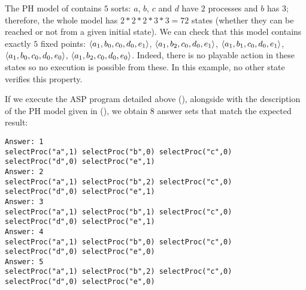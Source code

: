 \begin{example}
The PH model of  contains $5$ sorts:
$a$, $b$, $c$ and $d$ have $2$ processes and $b$ has 3; therefore, the whole model has $2*2*2*3*3 = 72$ states (whether they can be reached or not from a given initial state).
We can check that this model contains exactly $5$ fixed points: $\mbox{$\langle a_1, b_0, c_0, d_0, e_1 \rangle$}$, $\mbox{$\langle a_1, b_2, c_0, d_0, e_1 \rangle$}$, $\mbox{$\langle a_1, b_1, c_0, d_0, e_1 \rangle$}$, $\mbox{$\langle a_1, b_0, c_0, d_0, e_0 \rangle$}$, $\mbox{$\langle a_1, b_2, c_0, d_0, e_0 \rangle$}$.
Indeed, there is no playable action in these states so no execution is possible from these. In this example, no other state verifies this property.

If we execute the ASP program detailed above (),
alongside with the description of the PH model given in  (),
we obtain $8$ answer sets that match the expected result:
\begin{lstlisting}[numbers=none]
Answer: 1
selectProc("a",1) selectProc("b",0) selectProc("c",0)
selectProc("d",0) selectProc("e",1)
Answer: 2
selectProc("a",1) selectProc("b",2) selectProc("c",0)
selectProc("d",0) selectProc("e",1)
Answer: 3
selectProc("a",1) selectProc("b",1) selectProc("c",0)
selectProc("d",0) selectProc("e",1)
Answer: 4
selectProc("a",1) selectProc("b",0) selectProc("c",0)
selectProc("d",0) selectProc("e",0)
Answer: 5
selectProc("a",1) selectProc("b",2) selectProc("c",0)
selectProc("d",0) selectProc("e",0)
\end{lstlisting}
\end{example}